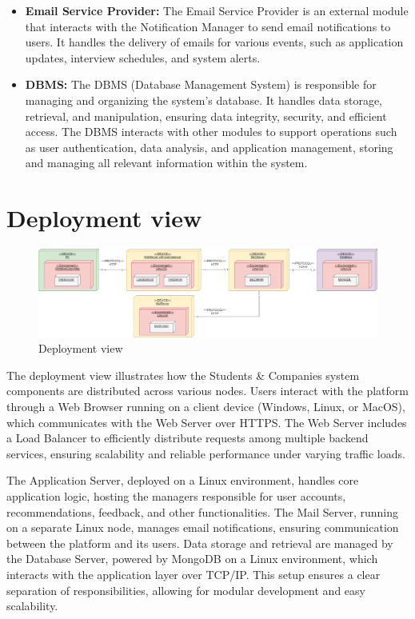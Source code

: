 \begin{itemize}
    \item \textbf{Email Service Provider:} The Email Service Provider is an external module that interacts with the Notification Manager to send email notifications to users. It handles the delivery of emails for various events, such as application updates, interview schedules, and system alerts.
    \item \textbf{DBMS:} The DBMS (Database Management System) is responsible for managing and organizing the system's database. It handles data storage, retrieval, and manipulation, ensuring data integrity, security, and efficient access. The DBMS interacts with other modules to support operations such as user authentication, data analysis, and application management, storing and managing all relevant information within the system.
    
\end{itemize}

\pagebreak
\section{Deployment view}
\begin{figure}[H]
    \centering
    \includegraphics[width=1\linewidth]{DD//Images/deployment.drawio.png}
    \caption{Deployment view}
    \label{fig:enter-label}
\end{figure}

The deployment view illustrates how the Students \& Companies system components are distributed across various nodes. Users interact with the platform through a Web Browser running on a client device (Windows, Linux, or MacOS), which communicates with the Web Server over HTTPS. The Web Server includes a Load Balancer to efficiently distribute requests among multiple backend services, ensuring scalability and reliable performance under varying traffic loads.

The Application Server, deployed on a Linux environment, handles core application logic, hosting the managers responsible for user accounts, recommendations, feedback, and other functionalities. The Mail Server, running on a separate Linux node, manages email notifications, ensuring communication between the platform and its users. Data storage and retrieval are managed by the Database Server, powered by MongoDB on a Linux environment, which interacts with the application layer over TCP/IP. This setup ensures a clear separation of responsibilities, allowing for modular development and easy scalability.

